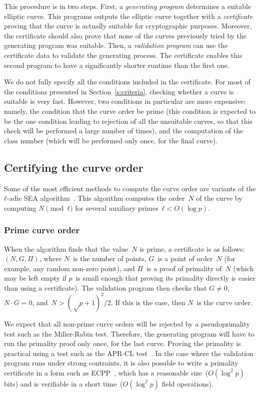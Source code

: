 \documentclass{article}
\begin{document}
This procedure is in two steps.
First, a \emph{generating program} determines a suitable elliptic curve.
This programs outputs the elliptic curve
together with a \emph{certificate} proving that
the curve is actually suitable for cryptographic purposes.
Moreover, the certificate should also prove that
none of the curves previously tried by the generating program
was suitable.
Then, a \emph{validation program} can use the certificate data
to validate the generating process.
The certificate enables this second program
to have a significantly shorter runtime than the first one.

We do not fully specify all the conditions included in the certificate.
For most of the conditions presented in Section~\ref{s:criteria},
checking whether a curve is suitable is very fast.
However, two conditions in particular are more expensive:
namely, the condition that the curve order be prime
(this condition is expected to be the one condition
leading to rejection of all the unsuitable curves,
so that this check will be performed a large number of times),
and the computation of the class number
(which will be performed only once, for the final curve).

\subsection{Certifying the curve order}

Some of the most efficient methods to compute the curve order are
variants of the $ℓ$-adic SEA algorithm~\cite{mathcomp1985schoof,
jtnb1995schoof}.
This algorithm computes the order~$N$ of the curve
by computing $N \pmod{ℓ}$ for several
auxiliary primes~$ℓ < O(\log p)$.

\subsubsection{Prime curve order}
When the algorithm finds that the value~$N$ is prime,
a certificate is as follows: $(N, G, Π)$,
where $N$~is the number of points,
$G$~is a point of order~$N$ (for example, any random non-zero point),
and $Π$~is a proof of primality of~$N$
(which may be left empty if $p$~is small enough
that proving its primality directly is easier than using a certificate).
The validation program then checks that $G ≠ 0$,
$N · G = 0$, and~$N > (√p+1)^2 / 2$.
If this is the case, then $N$~is the curve order.

We expect that all non-prime curve orders
will be rejected by a pseudoprimality test such as the Miller-Rabin test.
Therefore, the generating program will have to run the primality proof
only once, for the last curve.
Proving the primality is practical using a test such as
the APR-CL test~\cite{fcs1980adleman,mathcomp1984cl}.
In the case where the validation program runs under strong contraints,
it is also possible to write a primality certificate
in a form such as ECPP~\cite{mathcomp1993am},
which has a reasonable size~($O(\log^2 p)$ bits)
and is verifiable in a short time~($O(\log^2 p)$ field operations).
\end{document}
